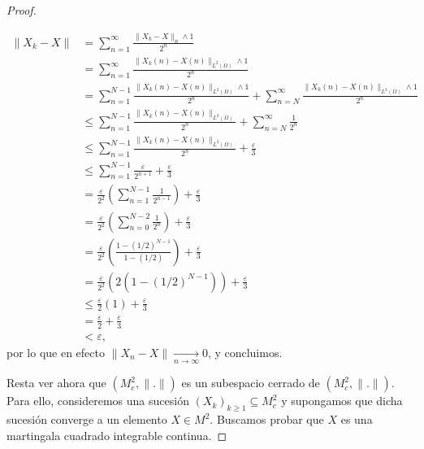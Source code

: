 \documentclass[letterpaper]{article}
\renewcommand{\to}{\rightarrow}
\newcommand{\1}{\mathds{1}}
\theoremstyle{definition}
\theoremstyle{definition}
\theoremstyle{definition}
\theoremstyle{definition}
\theoremstyle{definition}
\begin{document}
\begin{enumerate}
\begin{proof}
\begin{itemize}
            \begin{align*}
                \|X_k-X\|&=\sum_{n=1}^\infty \frac{\|X_k-X\|_n\wedge1}{2^{n}}\\
                &=\sum_{n=1}^\infty \frac{\|X_k(n)-X(n)\|_{L^2(\Omega)}\wedge1}{2^{n}}\\
                &=\sum_{n=1}^{N-1} \frac{\|X_k(n)-X(n)\|_{L^2(\Omega)}\wedge1}{2^{n}}+\sum_{n=N}^{\infty} \frac{\|X_k(n)-X(n)\|_{L^2(\Omega)}\wedge1}{2^{n}}\\
                &\leq\sum_{n=1}^{N-1} \frac{\|X_k(n)-X(n)\|_{L^2(\Omega)}}{2^{n}}+\sum_{n=N}^{\infty} \frac{1}{2^{n}}\\
                &\leq\sum_{n=1}^{N-1} \frac{\|X_k(n)-X(n)\|_{L^2(\Omega)}}{2^{n}}+\frac{\varepsilon}{3}\\
                &\leq\sum_{n=1}^{N-1} \frac{\varepsilon}{2^{n+1}}+\frac{\varepsilon}{3}\\
                &=\frac{\varepsilon}{2^2}\left(\sum_{n=1}^{N-1}\frac{1}{2^{n-1}}\right)+\frac{\varepsilon}{3}\\
                &=\frac{\varepsilon}{2^2}\left(\sum_{n=0}^{N-2}\frac{1}{2^{n}}\right)+\frac{\varepsilon}{3}\\
                &=\frac{\varepsilon}{2^2}\left(\frac{1-(1/2)^{N-1}}{1-(1/2)}\right)+\frac{\varepsilon}{3}\\
                &=\frac{\varepsilon}{2^2}\left(2(1-(1/2)^{N-1})\right)+\frac{\varepsilon}{3}\\
                &\leq\frac{\varepsilon}{2}\left(1\right)+\frac{\varepsilon}{3}\\
                &=\frac{\varepsilon}{2}+\frac{\varepsilon}{3}\\
                &<\varepsilon,
            \end{align*}
            por lo que en efecto $\|X_n-X\|\xrightarrow[n\to \infty]{}0$, y concluimos.            
        \end{itemize}
        Resta ver ahora que $(M_c^2,\|.\|)$ es un subespacio cerrado de $(M_c^2,\|.\|)$. Para ello, consideremos
        una sucesión $(X_k)_{k\geq1} \subseteq M^2_c$ y supongamos que dicha sucesión converge a un elemento $X\in M^2$. Buscamos
        probar que $X$ es una martingala cuadrado integrable continua.
        \newline


\end{proof}
\end{enumerate}
\end{document}
